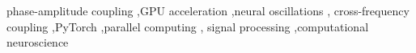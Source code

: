 \begin{keyword}
phase-amplitude coupling \sep GPU acceleration \sep neural oscillations \sep 
cross-frequency coupling \sep PyTorch \sep parallel computing \sep 
signal processing \sep computational neuroscience
\end{keyword}
